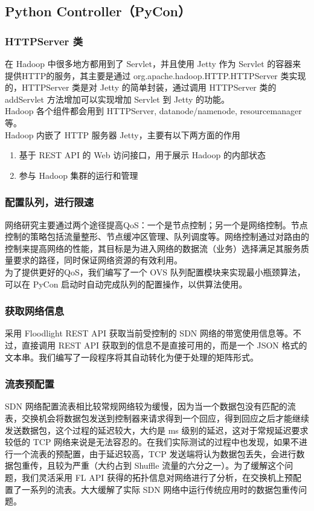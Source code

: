 \documentclass[a4paper, 11pt]{article}                                                   %
\begin{document}
\begin{CJK*}{UTF8}{song}
\subsection{Python Controller（PyCon）}
\subsubsection{HTTPServer 类}

在 Hadoop 中很多地方都用到了 Servlet，并且使用 Jetty 作为 Servlet 的容器来提供HTTP的服务，其主要是通过 org.apache.hadoop.HTTP.HTTPServer 类实现的，HTTPServer 类是对 Jetty 的简单封装，通过调用 HTTPServer 类的 addServlet 方法增加可以实现增加 Servlet 到 Jetty 的功能。\\
 Hadoop 各个组件都会用到 HTTPServer, datanode/namenode, resourcemanager等。\\
Hadoop 内嵌了 HTTP 服务器 Jetty，主要有以下两方面的作用
\begin{enumerate}
  \item 基于 REST API 的 Web 访问接口，用于展示 Hadoop 的内部状态
  \item 参与 Hadoop 集群的运行和管理
\end{enumerate}

\subsubsection{配置队列，进行限速}
网络研究主要通过两个途径提高QoS：一个是节点控制；另一个是网络控制。节点控制的策略包括流量整形、节点缓冲区管理、队列调度等。网络控制通过对路由的控制来提高网络的性能，其目标是为进入网络的数据流（业务）选择满足其服务质量要求的路径，同时保证网络资源的有效利用。\\
为了提供更好的QoS，我们编写了一个 OVS 队列配置模块来实现最小瓶颈算法，可以在 PyCon 启动时自动完成队列的配置操作，以供算法使用。

\subsubsection{获取网络信息}
采用 Floodlight REST API 获取当前受控制的 SDN 网络的带宽使用信息等。不过，直接调用 REST API 获取到的信息不是直接可用的，而是一个 JSON 格式的文本串。我们编写了一段程序将其自动转化为便于处理的矩阵形式。

\subsubsection{流表预配置}
SDN 网络配置流表相比较常规网络较为缓慢，因为当一个数据包没有匹配的流表，交换机会将数据包发送到控制器来请求得到一个回应，得到回应之后才能继续发送数据包，这个过程的延迟较大，大约是 ms 级别的延迟，这对于常规延迟要求较低的 TCP 网络来说是无法容忍的。在我们实际测试的过程中也发现，如果不进行一个流表的预配置，由于延迟较高，TCP 发送端将认为数据包丢失，会进行数据包重传，且较为严重（大约占到 Shuffle 流量的六分之一）。为了缓解这个问题，我们灵活采用 FL API 获得的拓扑信息对网络进行了分析，在交换机上预配置了一系列的流表。大大缓解了实际 SDN 网络中运行传统应用时的数据包重传问题。


\end{CJK*}
\end{document}
